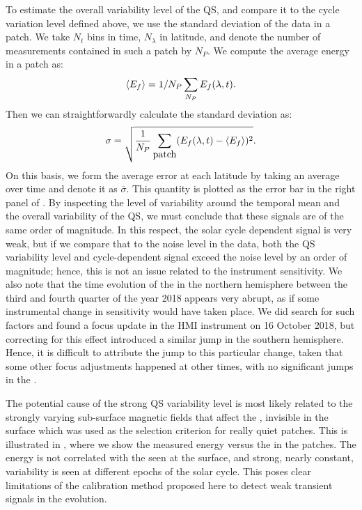 \documentclass{aa}
\begin{document}
To estimate 
the overall variability level of the QS, and compare it to the cycle variation level defined above,
we use the standard deviation of the data in a patch.
We take $N_t$ bins in time, $N_\lambda$ in latitude, and denote the number of \ef{} measurements contained in such a patch by $N_P$. We compute the average \fff energy in a patch as:
\begin{equation}
\langle E_f \rangle=1/N_P \sum_{N_P} E_f (\lambda,t).
\end{equation}
Then we can straightforwardly calculate the standard deviation as:
\begin{equation}
\sigma= \sqrt{\frac{1}{N_P}\sum_{\mbox{patch}} ( E_f(\lambda,t)
- \left<{E_f} \right>)^2}.
\end{equation}
On this basis, we form the average error at each latitude by taking an average over time and denote it as $\overline{\sigma}$. 
This quantity is plotted as the error bar in the right panel of 
.
By inspecting the level of variability around the temporal mean and the 
overall variability of the QS, we must conclude that these signals are of the same order of magnitude. 
In this respect, the solar cycle dependent signal is very weak, but if we compare that to the noise level in the data, both the QS variability level and cycle-dependent signal exceed the noise level by an order of magnitude; hence, this is not an issue related to the instrument sensitivity. We also note that the time evolution of the \fff in the northern hemisphere between the third and fourth quarter of the year 2018 appears very abrupt, as if some instrumental change in sensitivity would have taken place. We did search for such factors and found a focus update in the HMI instrument on 16 October 2018, but correcting for this effect introduced a similar jump in the southern hemisphere. Hence, it is difficult to attribute the jump to this particular change, taken that some other focus adjustments happened at other times, with no significant jumps in the \fffns.

The potential cause of the strong QS variability level is most likely related to the strongly varying sub-surface magnetic fields that affect the \fffns,
invisible in
the surface \brms{} which was used as the selection criterion for really quiet patches. 
This is illustrated in , where we show the measured \fff energy versus the \brms{} in the patches. The \fff energy is not correlated with the \brms{} seen at the surface, and strong, nearly constant, variability is seen at different epochs of the solar cycle. This poses clear limitations of the calibration method proposed here to detect weak transient signals in the \fff evolution.
\end{document}
